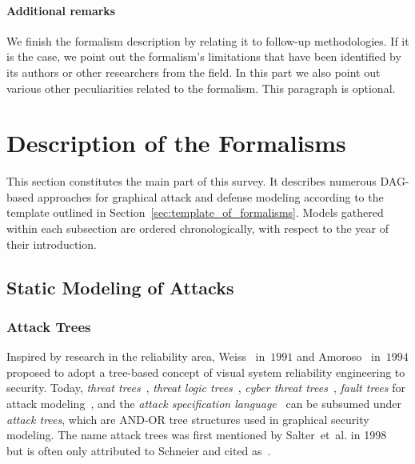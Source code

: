 \documentclass[a4paper]{article}
\begin{document}
\paragraph{Additional remarks}
We finish the formalism description by relating it to follow-up methodologies.
If it is the case, we point out the formalism's limitations that have been
identified by its authors or other researchers from the field. In this part we 
also point out various other peculiarities related to the formalism. This 
paragraph is optional.

\section{Description of the Formalisms}
\label{sec:main_survey}
This section constitutes the main part of this survey. It describes numerous 
DAG-based approaches for graphical attack and defense modeling according to the 
template outlined in Section~\ref{sec:template_of_formalisms}. 
Models gathered within each subsection are ordered chronologically, 
with respect to the year of their introduction. 

\subsection{Static Modeling of Attacks}
\label{sec:offensive_static}

\subsubsection{Attack Trees} 
\label{sec:attack_trees}

Inspired by research in the reliability area, Weiss~\cite{Weis} in~$1991$ and
Amoroso~\cite{Amor} in~$1994$ proposed to adopt a tree-based concept of visual
system reliability engineering to security. Today, \emph{threat
trees}~\cite{Amor,SwSn,HoLe,MaDoHeKoXu,DepD}, \emph{threat logic
trees}~\cite{Weis}, \emph{cyber threat trees}~\cite{OnTuThNaSzMa},
\emph{fault trees} for attack modeling~\cite{StSc}, and the \emph{attack
specification language}~\cite{TiLaFiHa} can be subsumed under \emph{attack
trees}, which are AND-OR tree structures used in graphical security modeling.
The name attack trees was first mentioned by Salter~et~al. in
1998~\cite{SaSaScWa} but is often only attributed to Schneier and cited
as~\cite{Schn,Schn2}.
\end{document}
